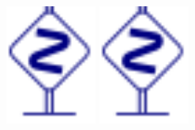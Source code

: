 \documentclass[t,10pt]{beamer}
\begin{document}
{
  \begin{frame}[c]
    \begin{center}
      \includegraphics[width=30mm]{dbend.pdf}\!\!%
      \includegraphics[width=30mm]{dbend.pdf}
    \end{center}
  \end{frame}
}
\end{document}
